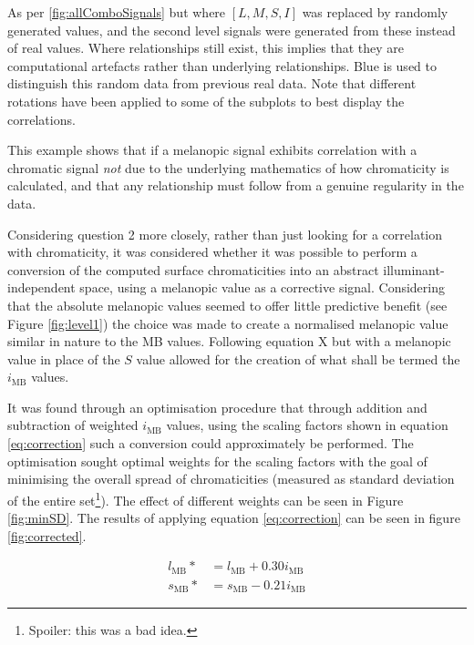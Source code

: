 \begin{fullpagefigure}
\caption{As per \ref{fig:allComboSignals} but where $[L,M,S,I]$ was replaced by randomly generated values, and the second level signals were generated from these instead of real values. Where relationships still exist, this implies that they are computational artefacts rather than underlying relationships. Blue is used to distinguish this random data from previous real data. Note that different rotations have been applied to some of the subplots to best display the correlations.}
\label{fig:allComboSignals_rand}
\end{fullpagefigure}

This example shows that if a melanopic signal exhibits correlation with a chromatic signal \emph{not} due to the underlying mathematics of how chromaticity is calculated, and that any relationship must follow from a genuine regularity in the data.

Considering question 2 more closely, rather than just looking for a correlation with chromaticity, it was considered whether it was possible to perform a conversion of the computed surface chromaticities into an abstract illuminant-independent space, using a melanopic value as a corrective signal. Considering that the absolute melanopic values seemed to offer little predictive benefit (see Figure \ref{fig:level1}) the choice was made to create a normalised melanopic value similar in nature to the MB values. Following equation X %
but with a melanopic value in place of the $S$ value allowed for the creation of what shall be termed the $i_{\text{MB}}$ values.

It was found through an optimisation procedure that through addition and subtraction of weighted $i_{\text{MB}}$ values, using the scaling factors shown in equation \ref{eq:correction} such a conversion could approximately be performed. The optimisation sought optimal weights for the scaling factors with the goal of minimising the overall spread of chromaticities (measured as standard deviation of the entire set\footnote{Spoiler: this was a bad idea.}). The effect of different weights can be seen in Figure \ref{fig:minSD}. The results of applying equation \ref{eq:correction} can be seen in figure \ref{fig:corrected}.

\begin{subequations} \label{eq:correction}
\begin{align}
l_{\text{MB}}* &= l_{\text{MB}} + 0.30i_{\text{MB}}\\ %
s_{\text{MB}}* &= s_{\text{MB}} - 0.21i_{\text{MB}}
\end{align}
\end{subequations}

